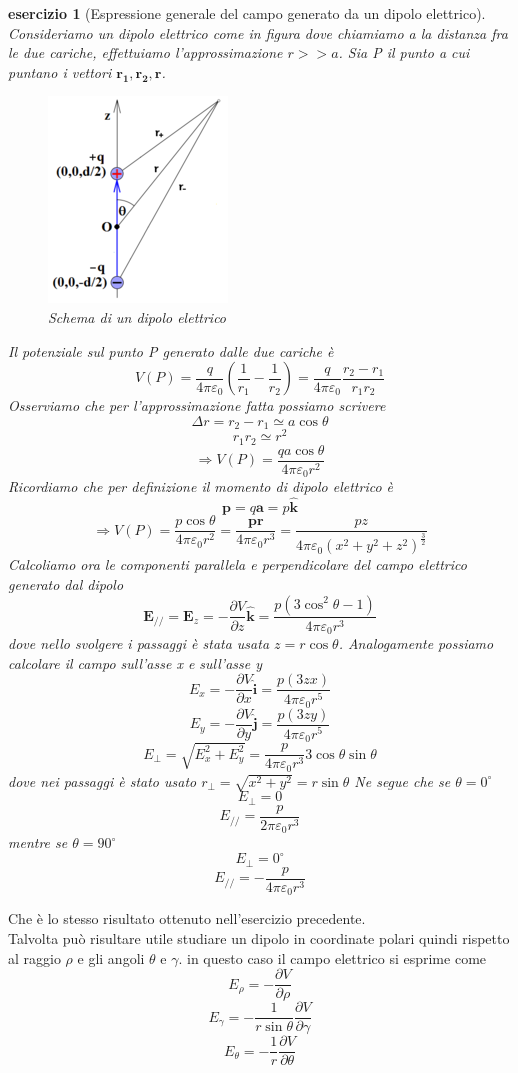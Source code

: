 \documentclass[10pt,a4paper]{article}
\newtheorem{esercizio}{esercizio}
\begin{document}
\begin{esercizio}[Espressione generale del campo generato da un dipolo elettrico]
	Consideriamo un dipolo elettrico come in figura dove chiamiamo a la distanza fra le due cariche, effettuiamo l'approssimazione \(r>>a\). Sia P il punto a cui puntano i vettori \(\mathbf{r_1}, \mathbf{r_2}, \mathbf{r}\). 
	\begin{figure}[h!]
		\centering
		\includegraphics[width=0.4\linewidth]{images/dipolo}
		\caption{Schema di un dipolo elettrico}
		\label{fig:dipolo}
	\end{figure}
	\FloatBarrier
	Il potenziale sul punto P generato dalle due cariche è
	\[V(P) = \frac{q}{4\pi\varepsilon_0}\left(\frac{1}{r_1}-\frac{1}{r_2}\right) =  \frac{q}{4\pi\varepsilon_0}\frac{r_2-r_1}{r_1r_2}\]
	Osserviamo che per l'approssimazione fatta possiamo scrivere
	\[\Delta r = r_2-r_1 \simeq a\cos\theta\]
	\[r_1r_2 \simeq r^2\]
	\[\Rightarrow V(P) = \frac{q a \cos\theta}{4\pi\varepsilon_0 r^2}\]
	Ricordiamo che per definizione il momento di dipolo elettrico è
	\[\mathbf{p} = q\mathbf{a} = p\hat{\mathbf{k}}\]
	\[\Rightarrow V(P) = \frac{p \cos\theta}{4\pi\varepsilon_0 r^2} = \frac{\mathbf{p}\mathbf{r}}{4\pi\varepsilon_0 r^3} = \frac{pz}{4\pi\varepsilon_0 (x^2+y^2+z^2)^{\frac{3}{2}}}\]
	Calcoliamo ora le componenti parallela e perpendicolare del campo elettrico generato dal dipolo
	\[\mathbf{E}_{//} = \mathbf{E}_z = -\frac{\partial V}{\partial z} \hat{\mathbf{k}} = \frac{p(3\cos^2\theta-1)}{4\pi\varepsilon_0 r^3}\]
	dove nello svolgere i passaggi è stata usata \(z = r\cos\theta\). Analogamente possiamo calcolare il campo sull'asse x e sull'asse y
	\[E_x = -\frac{\partial V}{\partial x} \hat{\mathbf{i}}=\frac{p(3zx)}{4\pi\varepsilon_0 r^5}\]
	\[E_y = -\frac{\partial V}{\partial y} \hat{\mathbf{j}}=\frac{p(3zy)}{4\pi\varepsilon_0 r^5}\]
	\[E_{\perp} = \sqrt{E_x^2+E_y^2} = \frac{p}{4\pi\varepsilon_0r^3}3\cos\theta\sin\theta\]
	dove nei passaggi è stato usato \(r_{\perp} = \sqrt{x^2+y^2} = r\sin\theta\)
	Ne segue che se \(\theta = 0^\circ \)
	\[E_{\perp} = 0\]
	\[E_{//} = \frac{p}{2\pi\varepsilon_0r^3}\]
	mentre se \(\theta = 90^\circ\)
	\[E_{\perp} = 0^\circ\]
	\[E_{//} = -\frac{p}{4\pi\varepsilon_0r^3}\]
\end{esercizio}
Che è lo stesso risultato ottenuto nell'esercizio precedente.\\
Talvolta può risultare utile studiare un dipolo in coordinate polari quindi rispetto al raggio $\rho$ e gli angoli $\theta$ e $\gamma$. in questo caso il campo elettrico si esprime come 
\[E_\rho = -\frac{\partial V}{\partial \rho}\]
\[E_\gamma = -\frac{1}{r\sin\theta}\frac{\partial V}{\partial \gamma}\]
\[E_\theta = -\frac{1}{r}\frac{\partial V}{\partial \theta}\]
\end{document}
